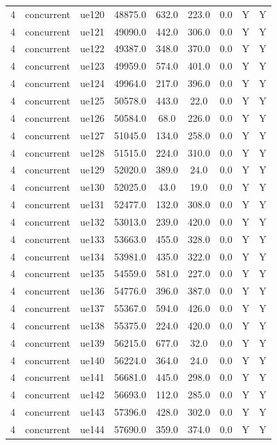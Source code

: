 \begin{table}[ht]
\begin{tabular}{|c|c|c|c|c|c|c|c|c|}
4 & concurrent & ue120 & 48875.0 & 632.0 & 223.0 & 0.0 & Y & Y \\
4 & concurrent & ue121 & 49090.0 & 442.0 & 306.0 & 0.0 & Y & Y \\
4 & concurrent & ue122 & 49387.0 & 348.0 & 370.0 & 0.0 & Y & Y \\
4 & concurrent & ue123 & 49959.0 & 574.0 & 401.0 & 0.0 & Y & Y \\
4 & concurrent & ue124 & 49964.0 & 217.0 & 396.0 & 0.0 & Y & Y \\
4 & concurrent & ue125 & 50578.0 & 443.0 & 22.0 & 0.0 & Y & Y \\
4 & concurrent & ue126 & 50584.0 & 68.0 & 226.0 & 0.0 & Y & Y \\
4 & concurrent & ue127 & 51045.0 & 134.0 & 258.0 & 0.0 & Y & Y \\
4 & concurrent & ue128 & 51515.0 & 224.0 & 310.0 & 0.0 & Y & Y \\
4 & concurrent & ue129 & 52020.0 & 389.0 & 24.0 & 0.0 & Y & Y \\
4 & concurrent & ue130 & 52025.0 & 43.0 & 19.0 & 0.0 & Y & Y \\
4 & concurrent & ue131 & 52477.0 & 132.0 & 308.0 & 0.0 & Y & Y \\
4 & concurrent & ue132 & 53013.0 & 239.0 & 420.0 & 0.0 & Y & Y \\
4 & concurrent & ue133 & 53663.0 & 455.0 & 328.0 & 0.0 & Y & Y \\
4 & concurrent & ue134 & 53981.0 & 435.0 & 322.0 & 0.0 & Y & Y \\
4 & concurrent & ue135 & 54559.0 & 581.0 & 227.0 & 0.0 & Y & Y \\
4 & concurrent & ue136 & 54776.0 & 396.0 & 387.0 & 0.0 & Y & Y \\
4 & concurrent & ue137 & 55367.0 & 594.0 & 426.0 & 0.0 & Y & Y \\
4 & concurrent & ue138 & 55375.0 & 224.0 & 420.0 & 0.0 & Y & Y \\
4 & concurrent & ue139 & 56215.0 & 677.0 & 32.0 & 0.0 & Y & Y \\
4 & concurrent & ue140 & 56224.0 & 364.0 & 24.0 & 0.0 & Y & Y \\
4 & concurrent & ue141 & 56681.0 & 445.0 & 298.0 & 0.0 & Y & Y \\
4 & concurrent & ue142 & 56693.0 & 112.0 & 285.0 & 0.0 & Y & Y \\
4 & concurrent & ue143 & 57396.0 & 428.0 & 302.0 & 0.0 & Y & Y \\
4 & concurrent & ue144 & 57690.0 & 359.0 & 374.0 & 0.0 & Y & Y \\

\end{tabular}
\end{table}
